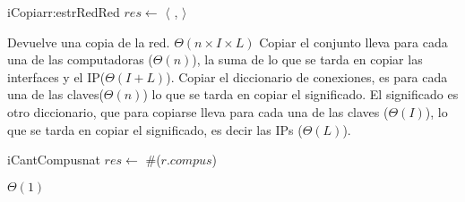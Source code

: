 \begin{Algoritmos}
  \begin{algoritmo}{iCopiar}{\In r:estrRed}{Red}
   	$res \gets$ $\langle$ ,  $\rangle$
  \end{algoritmo}
  \datosAlgoritmo
  {Devuelve una copia de la red.} %
  {} %
  {} %
  {$\Theta(n \times I \times L)$} %
  {Copiar el conjunto lleva para cada una de las computadoras ($\Theta(n)$), la suma de lo que se tarda en copiar las interfaces y el IP($\Theta(I + L)$). Copiar el diccionario de conexiones, es para cada una de las claves($\Theta(n)$) lo que se tarda en copiar el significado. El significado es otro diccionario, que para copiarse lleva para cada una de las claves ($\Theta(I)$), lo que se tarda en copiar el significado, es decir las IPs ($\Theta(L)$). } %

  \begin{algoritmo}{iCantCompus}{}{nat}
    $res \gets$ $\#$($r.compus$) 
  \end{algoritmo}   
  \datosAlgoritmo{} %
  {} %
  {} %
  {$\Theta(1)$} %
  {} %

\end{Algoritmos}
